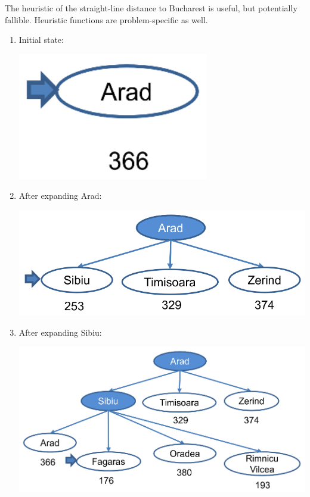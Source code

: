 \documentclass[11pt]{article}
\begin{document}
The heuristic of the straight-line distance to Bucharest is useful, but potentially fallible. Heuristic functions are problem-specific as well.

\begin{enumerate}
\item Initial state:
\begin{center}
\includegraphics[height=15em]{./images/greedy-search-example-initial-state-diagram.png}
\end{center}
\item After expanding Arad:
\begin{center}
\includegraphics[width=.9\linewidth]{./images/greedy-search-example-after-expanding-arad-diagram.png}
\end{center}
\item After expanding Sibiu:
\begin{center}
\includegraphics[width=.9\linewidth]{./images/greedy-search-example-after-expanding-sibiu-diagram.png}

\end{center}
\end{enumerate}
\end{document}
